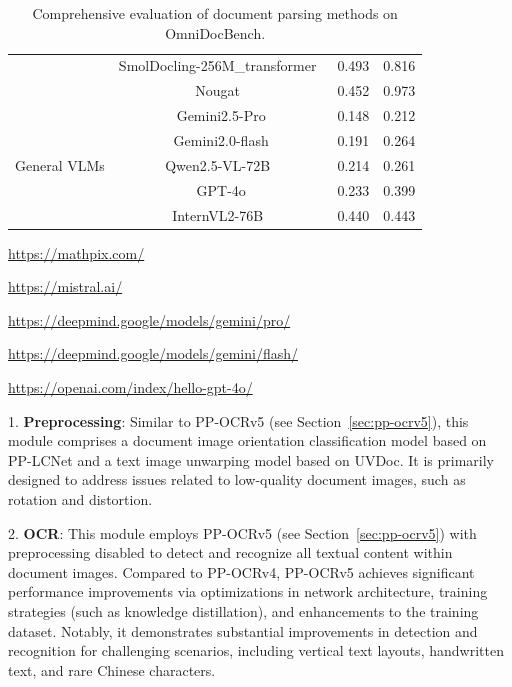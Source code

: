 \documentclass[11pt, a4paper, logo, copyright, nonumbering]{paddleocr}
\begin{document}
\begin{table}[!h]
\begin{threeparttable}
\begin{tabular}{c|c|cc}
                                        & SmolDocling-256M\_transformer~\citep{nassar2025smoldocling} & 0.493          & 0.816          \\
                                        & Nougat~\citep{blecher2023nougat}                        & 0.452          & 0.973          \\
        \midrule
        \multirow{5}{*}{General VLMs}   & Gemini2.5-Pro\tnote{3}        & 0.148          & 0.212          \\
                                        & Gemini2.0-flash\tnote{4}  & 0.191          & 0.264          \\
                                        & Qwen2.5-VL-72B~\citep{qwen2.5}                                                      & 0.214          & 0.261          \\
                                        & GPT-4o\tnote{5}    & 0.233          & 0.399          \\
                                        & InternVL2-76B~\citep{chen2024expanding}                                             & 0.440          & 0.443          \\
        \bottomrule
    \end{tabular}
    \begin{tablenotes}
        \footnotesize
        \item[1] \url{https://mathpix.com/}
        \item[2] \url{https://mistral.ai/}
        \item[3] \url{https://deepmind.google/models/gemini/pro/}
        \item[4] \url{https://deepmind.google/models/gemini/flash/}
        \item[5] \url{https://openai.com/index/hello-gpt-4o/}
    \end{tablenotes}
    \caption{Comprehensive evaluation of document parsing methods on OmniDocBench.}
    \label{tab:pp-structurev3-omnidocbench}
    \end{threeparttable}
\end{table}

1. \textbf{Preprocessing}: Similar to PP-OCRv5 (see Section~\ref{sec:pp-ocrv5}), this module comprises a document image orientation classification model based on PP-LCNet and a text image unwarping model based on UVDoc. It is primarily designed to address issues related to low-quality document images, such as rotation and distortion.

2. \textbf{OCR}: This module employs PP-OCRv5 (see Section~\ref{sec:pp-ocrv5}) with preprocessing disabled to detect and recognize all textual content within document images. Compared to PP-OCRv4, PP-OCRv5 achieves significant performance improvements via optimizations in network architecture, training strategies (such as knowledge distillation), and enhancements to the training dataset. Notably, it demonstrates substantial improvements in detection and recognition for challenging scenarios, including vertical text layouts, handwritten text, and rare Chinese characters.
\end{document}
